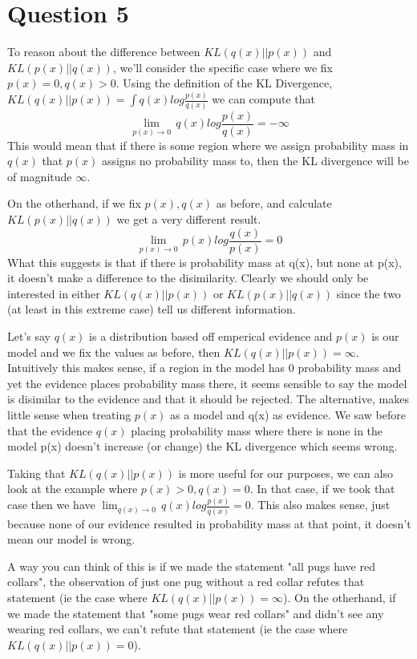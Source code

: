 \documentclass[]{article}
\begin{document}
    \section*{Question 5}
    \par To reason about the difference between $KL(q(x)||p(x))$ and $KL(p(x)||q(x))$, we'll consider the specific case where we fix $p(x) = 0, q(x) > 0$. Using the definition of the KL Divergence, $KL(q(x)||p(x)) = \int q(x) log\frac{p(x)}{q(x)}$ we can compute that $$\lim_{p(x)\rightarrow 0}\, q(x) log \frac{p(x)}{q(x)} = -\infty$$ This would mean that if there is some region where we assign probability mass in $q(x)$ that $p(x)$ assigns no probability mass to, then the KL divergence will be of magnitude $\infty$.
    
    \par On the otherhand, if we fix $p(x), q(x)$ as before, and calculate $KL(p(x)||q(x))$ we get a very different result. $$\lim_{p(x)\rightarrow 0} \, p(x) log \frac{q(x)}{p(x)} = 0$$ What this suggests is that if there is probability mass at q(x), but none at p(x), it doesn't make a difference to the disimilarity. Clearly we should only be interested in either $KL(q(x)||p(x))$ or $KL(p(x)||q(x))$ since the two (at least in this extreme case) tell us different information.
    
    \par Let's say $q(x)$ is a distribution based off emperical evidence and $p(x)$ is our model and we fix the values as before, then $KL(q(x)||p(x)) = \infty$. Intuitively this makes sense, if a region in the model has 0 probability mass and yet the evidence places probability mass there, it seems sensible to say the model is disimilar to the evidence and that it should be rejected. The alternative, makes little sense when treating $p(x)$ as a model and q(x) as evidence. We saw before that the evidence $q(x)$ placing probability mass where there is none in the model p(x) doesn't increase (or change) the KL divergence which seems wrong. 
    
    \par Taking that $KL(q(x)||p(x))$ is more useful for our purposes, we can also look at the example where $p(x)>0, q(x)=0$. In that case, if we took that case then we have $\lim_{q(x)\rightarrow 0} \, q(x) log \frac{p(x)}{q(x)} = 0$. This also makes sense, just because none of our evidence resulted in probability mass at that point, it doesn't mean our model is wrong. 
    
    \par A way you can think of this is if we made the statement "all pugs have red collars", the observation of just one pug without a red collar refutes that statement (ie the case where $KL(q(x)||p(x))=\infty$). On the otherhand, if we made the statement that "some pugs wear red collars" and didn't see any wearing red collars, we can't refute that statement (ie the case where $KL(q(x)||p(x))=0$). \cite{inftheory}
    
\end{document}
